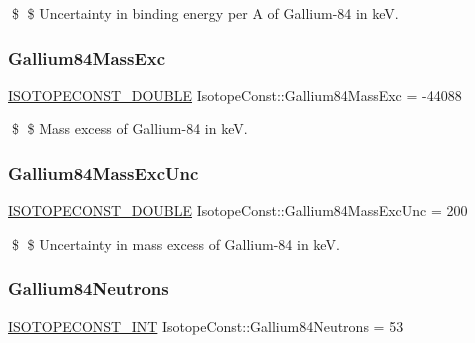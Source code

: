 \$ \$ Uncertainty in binding energy per A of Gallium-\/84 in keV. \mbox{\label{group___isotope_const-_gallium-_ga84_ga812c7d4076e6dd3125040154ca92b3f6}} 
\subsubsection{\texorpdfstring{Gallium84\+Mass\+Exc}{Gallium84MassExc}}
{\footnotesize\ttfamily \mbox{\hyperlink{group___isotope_const-_macros_ga8f45a7272ce02c0b4c65c44636ed719a}{I\+S\+O\+T\+O\+P\+E\+C\+O\+N\+S\+T\+\_\+\+D\+O\+U\+B\+LE}} Isotope\+Const\+::\+Gallium84\+Mass\+Exc = -\/44088}

\$ \$ Mass excess of Gallium-\/84 in keV. \mbox{\label{group___isotope_const-_gallium-_ga84_ga1ca1608048684c1acaa63358e9126b71}} 
\subsubsection{\texorpdfstring{Gallium84\+Mass\+Exc\+Unc}{Gallium84MassExcUnc}}
{\footnotesize\ttfamily \mbox{\hyperlink{group___isotope_const-_macros_ga8f45a7272ce02c0b4c65c44636ed719a}{I\+S\+O\+T\+O\+P\+E\+C\+O\+N\+S\+T\+\_\+\+D\+O\+U\+B\+LE}} Isotope\+Const\+::\+Gallium84\+Mass\+Exc\+Unc = 200}

\$ \$ Uncertainty in mass excess of Gallium-\/84 in keV. \mbox{\label{group___isotope_const-_gallium-_ga84_gaf327654eb421de1fe529e24e2c1d740b}} 
\subsubsection{\texorpdfstring{Gallium84\+Neutrons}{Gallium84Neutrons}}
{\footnotesize\ttfamily \mbox{\hyperlink{group___isotope_const-_macros_ga5f18360b3e99483a35c32d789e62621c}{I\+S\+O\+T\+O\+P\+E\+C\+O\+N\+S\+T\+\_\+\+I\+NT}} Isotope\+Const\+::\+Gallium84\+Neutrons = 53}

